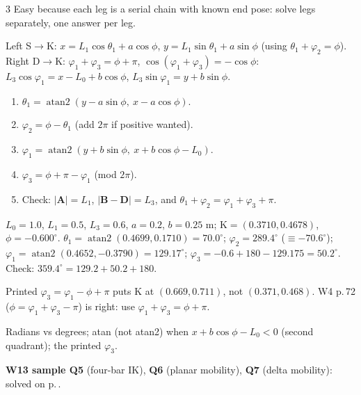 \begin{multicols}{3}
Easy because each leg is a serial chain with known end pose: solve legs separately, one answer per leg.
\begin{deriv}[\pg{70--72}]
Left {S}$\to$K: $x=L_1\cos\theta_1+a\cos\phi$, $y=L_1\sin\theta_1+a\sin\phi$ (using $\theta_1+\varphi_2=\phi$).
Right {D}$\to$K: $\varphi_1+\varphi_3=\phi+\pi$, $\cos(\varphi_1+\varphi_3)=-\cos\phi$: $L_3\cos\varphi_1=x-L_0+b\cos\phi$, $L_3\sin\varphi_1=y+b\sin\phi$.
\end{deriv}
\begin{recipe}
\begin{enumerate}
\item $\theta_1=\operatorname{atan2}(y-a\sin\phi,\ x-a\cos\phi)$.
\item $\varphi_2=\phi-\theta_1$ (add $2\pi$ if positive wanted).
\item $\varphi_1=\operatorname{atan2}(y+b\sin\phi,\ x+b\cos\phi-L_0)$.
\item $\varphi_3=\phi+\pi-\varphi_1$ (mod $2\pi$).
\item Check: $\lvert\mathbf A\rvert=L_1$, $\lvert\mathbf B-\mathbf D\rvert=L_3$, and $\theta_1+\varphi_2=\varphi_1+\varphi_3+\pi$.
\end{enumerate}
\end{recipe}
\begin{worked}[IK numbers]
$L_0=1.0$, $L_1=0.5$, $L_3=0.6$, $a=0.2$, $b=0.25$ m; K$=(0.3710,0.4678)$, $\phi=-0.600^\circ$.
$\theta_1=\operatorname{atan2}(0.4699,0.1710)=70.0^\circ$; $\varphi_2=289.4^\circ$ ($\equiv-70.6^\circ$); $\varphi_1=\operatorname{atan2}(0.4652,-0.3790)=129.17^\circ$; $\varphi_3=-0.6+180-129.175=50.2^\circ$. Check: $359.4^\circ=129.2+50.2+180$. \chk
\end{worked}
\begin{slideerr}[W13 p.\,11 (Q5)]
Printed $\varphi_3=\varphi_1-\phi+\pi$ puts K at $(0.669,0.711)$, not $(0.371,0.468)$. W4 p.\,72 ($\phi=\varphi_1+\varphi_3-\pi$) is right: use $\varphi_1+\varphi_3=\phi+\pi$. \chk
\end{slideerr}
\begin{trap}
Radians vs degrees; atan (not atan2) when $x+b\cos\phi-L_0<0$ (second quadrant); the printed $\varphi_3$.
\end{trap}
\textbf{W13 sample Q5} (four-bar IK), \textbf{Q6} (planar mobility), \textbf{Q7} (delta mobility): solved on p.\,\pageref{p:SAMPLE}.


\end{multicols}
